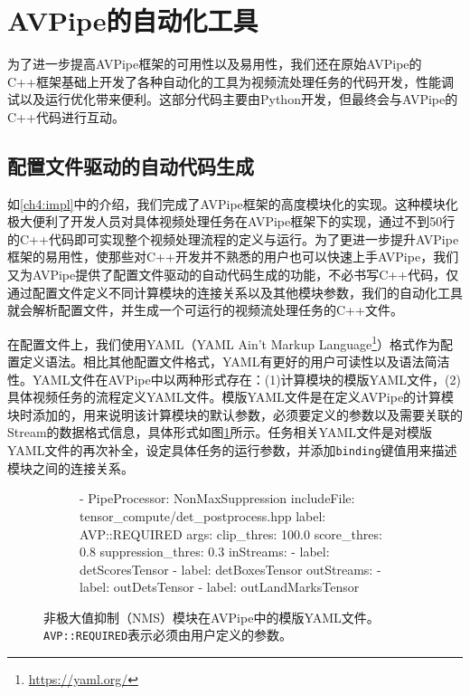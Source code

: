 \section{AVPipe的自动化工具}
为了进一步提高AVPipe框架的可用性以及易用性，我们还在原始AVPipe的C++框架基础上开发了各种自动化的工具为视频流处理任务的代码开发，性能调试以及运行优化带来便利。这部分代码主要由Python开发，但最终会与AVPipe的C++代码进行互动。
\subsection{配置文件驱动的自动代码生成}\label{ch4:auto_codegen}
如\ref{ch4:impl}中的介绍，我们完成了AVPipe框架的高度模块化的实现。这种模块化极大便利了开发人员对具体视频处理任务在AVPipe框架下的实现，通过不到50行的C++代码即可实现整个视频处理流程的定义与运行。为了更进一步提升AVPipe框架的易用性，使那些对C++开发并不熟悉的用户也可以快速上手AVPipe，我们又为AVPipe提供了配置文件驱动的自动代码生成的功能，不必书写C++代码，仅通过配置文件定义不同计算模块的连接关系以及其他模块参数，我们的自动化工具就会解析配置文件，并生成一个可运行的视频流处理任务的C++文件。\par
在配置文件上，我们使用YAML（YAML Ain't Markup Language\footnote{\url{https://yaml.org/}}）格式作为配置定义语法。相比其他配置文件格式，YAML有更好的用户可读性以及语法简洁性。YAML文件在AVPipe中以两种形式存在：(1)计算模块的模版YAML文件，(2)具体视频任务的流程定义YAML文件。模版YAML文件是在定义AVPipe的计算模块时添加的，用来说明该计算模块的默认参数，必须要定义的参数以及需要关联的Stream的数据格式信息，具体形式如图\ref{fig:yaml}所示。任务相关YAML文件是对模版YAML文件的再次补全，设定具体任务的运行参数，并添加\texttt{binding}键值用来描述模块之间的连接关系。\par

\begin{figure}[!htp]
  \centering
  \begin{subfigure}{0.7\textwidth}
    \centering
    
\begin{codeblock}[language=Ruby, basicstyle=\ttfamily\small]
- PipeProcessor: NonMaxSuppression
  includeFile: tensor_compute/det_postprocess.hpp
  label: AVP::REQUIRED
  args:
    clip_thres: 100.0
    score_thres: 0.8
    suppression_thres: 0.3
  inStreams:
  - label: detScoresTensor
  - label: detBoxesTensor
  outStreams:
  - label: outDetsTensor
  - label: outLandMarksTensor
\end{codeblock}
  \end{subfigure}
  
  \caption[AVPipe计算模块的模版YAML文件]{非极大值抑制（NMS）模块在AVPipe中的模版YAML文件。\texttt{AVP::REQUIRED}表示必须由用户定义的参数。}
  \label{fig:yaml}
\end{figure}

